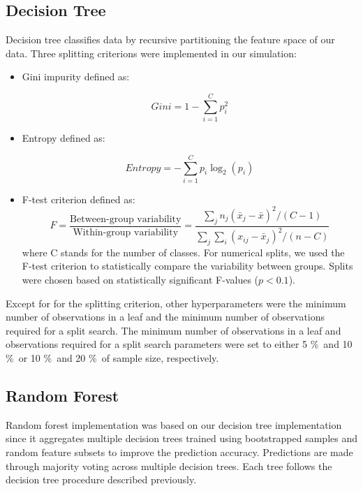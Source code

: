 \documentclass[12pt]{article}
\begin{document}
\subsection{Decision Tree}
Decision tree classifies data by recursive partitioning the feature space of our data. Three splitting criterions were implemented in our simulation:

\begin{itemize}
    \item Gini impurity defined as:

    \begin{equation}
    Gini = 1 - \sum_{i=1}^{C} p_i^2
    \end{equation}
    \item Entropy defined as:

    \begin{equation}
    Entropy = -\sum_{i=1}^{C} p_i \log_2(p_i)
    \end{equation}
    \item F-test criterion defined as:
    \begin{equation}
    F = \frac{\text{Between-group variability}}{\text{Within-group variability}} 
    = \frac{\sum_j n_j(\bar{x}_j - \bar{x})^2/(C-1)}{\sum_j\sum_i(x_{ij}-\bar{x}_j)^2/(n-C)}
    \end{equation}
where C stands for the number of classes.
    For numerical splits, we used the F-test criterion to statistically compare the variability between groups. Splits were chosen based on statistically significant F-values ($p<0.1$).
\end{itemize}

Except for for the splitting criterion, other hyperparameters were the minimum number of observations in a leaf and the minimum number of observations required for a split search. The minimum number of observations in a leaf
and observations required for a split search parameters were set
to either 5 \%\ and 10 \%\ or 10 \%\ and 20 \%\ of sample size, respectively.
\subsection{Random Forest}

Random forest implementation was based on our decision tree implementation since it aggregates multiple decision trees trained using bootstrapped samples and random feature subsets to improve the prediction accuracy. Predictions are made through majority voting across multiple decision trees.
Each tree follows the decision tree procedure described previously.
\end{document}
